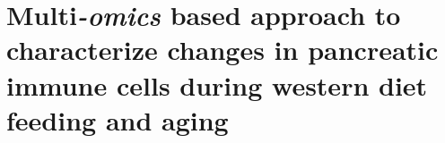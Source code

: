 
\chapter{Multi\textit{-omics} based approach to characterize changes in pancreatic immune cells during western diet feeding and aging}
\label{chp:diet_aging}

\newpage\null\thispagestyle{empty}\newpage


\begin{Abstract}
    
\end{Abstract}
    
    
\clearpage

